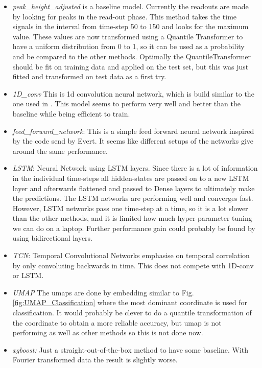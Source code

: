 \begin{itemize}
    \item \textit{peak\_height\_adjusted} is a baseline model. Currently the readouts are made by looking for peaks in the read-out phase. This method takes the time signals in the interval from time-step 50 to 150 and looks for the maximum value. These values are now transformed using a Quantile Transformer to have a uniform distribution from 0 to 1, so it can be used as a probability and be compared to the other methods. Optimally the QuantileTransformer should be fit on training data and applied on the test set, but this was just fitted and transformed on test data as a first try.
    \item \textit{1D\_conv} This is 1d convolution neural network, which is build similar to the one used in \cite{Struck2020}. This model seems to perform very well and better than the baseline while being efficient to train.
    \item \textit{feed\_forward\_network}: This is a simple feed forward neural network inspired by the code send by Evert. It seems like different setups of the networks give around the same performance.
    \item \textit{LSTM}: Neural Network using LSTM layers. Since there is a lot of information in the individual time-steps all hidden-states are passed on to a new LSTM layer and afterwards flattened and passed to Dense layers to ultimately make the predictions. The LSTM networks are performing well and converges fast. However, LSTM networks pass one time-step at a time, so it is a lot slower than the other methods, and it is limited how much hyper-parameter tuning we can do on a laptop. Further performance gain could probably be found by using bidirectional layers.
    \item \textit{TCN}: Temporal Convolutional Networks emphasise on temporal correlation by only convoluting backwards in time. This does not compete with 1D-conv or LSTM.
    \item \textit{UMAP} The umaps are done by embedding similar to Fig. \ref{fig:UMAP_Classification} where the most dominant coordinate is used for classification. It would probably be clever to do a quantile transformation of the coordinate to obtain a more reliable accuracy, but umap is not performing as well as other methods so this is not done now.
    \item \textit{xgboost:} Just a straight-out-of-the-box method to have some baseline. With Fourier transformed data the result is slightly worse.
\end{itemize}



